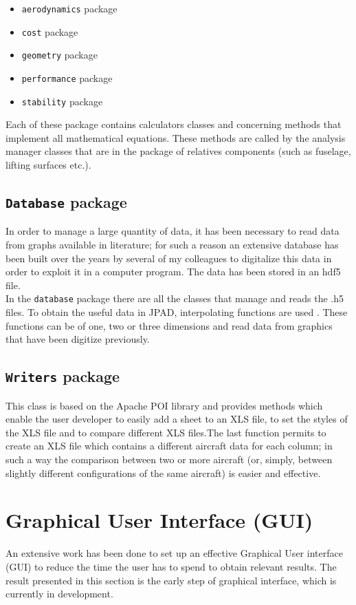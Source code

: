  \begin{itemize}
 \item {\texttt{aerodynamics} package}
\item {\texttt{cost} package}
\item {\texttt{geometry} package}
\item {\texttt{performance} package}
\item {\texttt{stability} package}
\end{itemize} 

Each of these package contains calculators classes and concerning methods that implement all mathematical equations. These methods are called by the analysis manager classes that are in the package of relatives components (such as fuselage, lifting surfaces etc.).

\subsection{\texttt{Database} package}
In order to manage a large quantity of data, it has been necessary to read data from graphs available in literature; for such a reason an extensive database has been built over the years by several of my colleagues to digitalize this data in order to exploit it in a computer program. The data has been stored in an hdf5 file.\\
In the \texttt{database} package there are all the classes that manage and reads the .h5 files. To obtain the useful data in JPAD, interpolating functions are used . These functions can be of one, two or three dimensions and read data from graphics that have been digitize previously.

\subsection{\texttt{Writers} package}
 This class is based on the Apache POI library and provides methods which enable the user developer to easily add a sheet to an XLS file, to set the styles of the XLS file and to compare different XLS files.The last function permits to create an XLS file which contains a different aircraft data for each column; in such a way the comparison between two or more aircraft (or,
simply, between slightly different configurations of the same aircraft) is easier and effective.



\section{Graphical User Interface (GUI)}
An extensive work has been done to set up an effective Graphical User interface (GUI) to reduce the time the user has to spend to obtain relevant results. The result presented in this section is the early step of graphical interface, which is currently in development.\\ 

